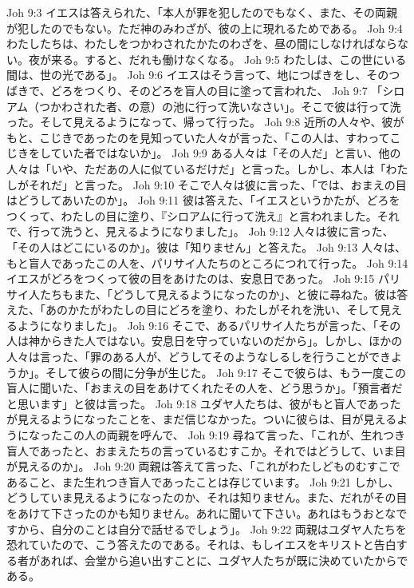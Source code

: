 Joh 9:3  イエスは答えられた、「本人が罪を犯したのでもなく、また、その両親が犯したのでもない。ただ神のみわざが、彼の上に現れるためである。
Joh 9:4  わたしたちは、わたしをつかわされたかたのわざを、昼の間にしなければならない。夜が来る。すると、だれも働けなくなる。
Joh 9:5  わたしは、この世にいる間は、世の光である」。
Joh 9:6  イエスはそう言って、地につばきをし、そのつばきで、どろをつくり、そのどろを盲人の目に塗って言われた、
Joh 9:7  「シロアム（つかわされた者、の意）の池に行って洗いなさい」。そこで彼は行って洗った。そして見えるようになって、帰って行った。
Joh 9:8  近所の人々や、彼がもと、こじきであったのを見知っていた人々が言った、「この人は、すわってこじきをしていた者ではないか」。
Joh 9:9  ある人々は「その人だ」と言い、他の人々は「いや、ただあの人に似ているだけだ」と言った。しかし、本人は「わたしがそれだ」と言った。
Joh 9:10  そこで人々は彼に言った、「では、おまえの目はどうしてあいたのか」。
Joh 9:11  彼は答えた、「イエスというかたが、どろをつくって、わたしの目に塗り、『シロアムに行って洗え』と言われました。それで、行って洗うと、見えるようになりました」。
Joh 9:12  人々は彼に言った、「その人はどこにいるのか」。彼は「知りません」と答えた。
Joh 9:13  人々は、もと盲人であったこの人を、パリサイ人たちのところにつれて行った。
Joh 9:14  イエスがどろをつくって彼の目をあけたのは、安息日であった。
Joh 9:15  パリサイ人たちもまた、「どうして見えるようになったのか」、と彼に尋ねた。彼は答えた、「あのかたがわたしの目にどろを塗り、わたしがそれを洗い、そして見えるようになりました」。
Joh 9:16  そこで、あるパリサイ人たちが言った、「その人は神からきた人ではない。安息日を守っていないのだから」。しかし、ほかの人々は言った、「罪のある人が、どうしてそのようなしるしを行うことができようか」。そして彼らの間に分争が生じた。
Joh 9:17  そこで彼らは、もう一度この盲人に聞いた、「おまえの目をあけてくれたその人を、どう思うか」。「預言者だと思います」と彼は言った。
Joh 9:18  ユダヤ人たちは、彼がもと盲人であったが見えるようになったことを、まだ信じなかった。ついに彼らは、目が見えるようになったこの人の両親を呼んで、
Joh 9:19  尋ねて言った、「これが、生れつき盲人であったと、おまえたちの言っているむすこか。それではどうして、いま目が見えるのか」。
Joh 9:20  両親は答えて言った、「これがわたしどものむすこであること、また生れつき盲人であったことは存じています。
Joh 9:21  しかし、どうしていま見えるようになったのか、それは知りません。また、だれがその目をあけて下さったのかも知りません。あれに聞いて下さい。あれはもうおとなですから、自分のことは自分で話せるでしょう」。
Joh 9:22  両親はユダヤ人たちを恐れていたので、こう答えたのである。それは、もしイエスをキリストと告白する者があれば、会堂から追い出すことに、ユダヤ人たちが既に決めていたからである。
